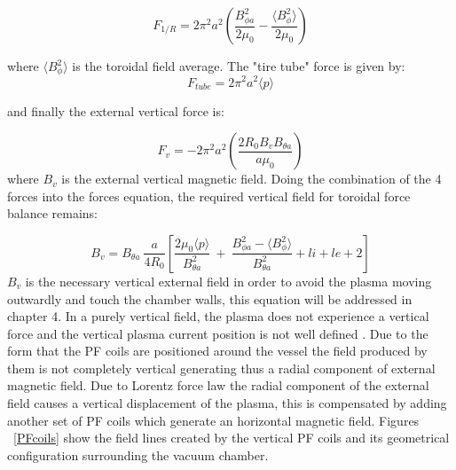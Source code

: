  \begin{equation}
 F_{1/R}=2\pi^2a^2 \left(\frac{ B_{\phi a}^2}{2\mu_0 }-\frac{\langle B_{\phi}^2 \rangle}{ 2\mu_0}\right)
 \end{equation}

where $\langle B_{\phi}^2 \rangle$ is the toroidal field average. The "tire tube" force is given by:
\begin{equation}
F_{tube}=2\pi^2a^2\langle p \rangle
\end{equation}

and finally the external vertical force is:

\begin{equation}
F_v=-2\pi^2a^2\left(\frac{2R_0 B_v B_{\theta a}}{a\mu_0}\right)
\end{equation}
 where $B_v$ is the external vertical magnetic field. Doing the combination of the 4 forces into the forces equation, the required vertical field for toroidal force balance remains:
 
 \begin{equation}
 B_v=B_{\theta a} ~\frac{a}{4R_0}\left[ \frac{2\mu_0 \langle p \rangle }{ B_{\theta a}^2} ~+~\frac{ B_{\phi a}^2 - \langle B_{\phi}^2 \rangle }{B_{\theta a}^2 } +li+le+2 \right]
 \label{force_balance}
 \end{equation}
  $B_v$ is the necessary vertical external field in order to avoid the plasma moving outwardly and touch the chamber walls, this equation will be addressed in chapter 4. In a purely vertical field, the plasma does not experience a vertical force and the vertical plasma current position is not well defined \cite[Chapter~4]{Zohm2015}. Due to the form  that the PF coils are positioned around the vessel the field produced by them is not completely vertical generating thus a radial component of  external magnetic field.  Due to Lorentz force law  the radial component of the external field  causes a vertical displacement of the plasma, this is compensated by adding another set of PF coils which generate an horizontal magnetic field. Figures ~\ref{PFcoils} show the field lines created by the vertical PF coils and its geometrical configuration surrounding the vacuum chamber. \smallskip
  
